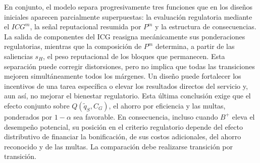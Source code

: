 En conjunto, el modelo separa progresivamente tres funciones que en los diseños iniciales aparecen parcialmente superpuestas: la evaluación regulatoria mediante el \(ICG^m\), la señal reputacional resumida por \(P^m\) y la estructura de consecuencias. La salida de componentes del ICG reasigna mecánicamente sus ponderaciones regulatorias, mientras que la composición de \(P^m\) determina, a partir de las saliencias \(s_H\), el peso reputacional de los bloques que permanecen. Esta separación puede corregir distorsiones, pero no implica que todas las transiciones mejoren simultáneamente todos los márgenes. Un diseño puede fortalecer los incentivos de una tarea específica o elevar los resultados directos del servicio y, aun así, no mejorar el bienestar regulatorio. Esta última conclusión exige que el efecto conjunto sobre \(Q(\widetilde q_S,C_G)\), el ahorro por eficiencia y las multas, ponderados por \(1-\alpha\) sea favorable. En consecuencia, incluso cuando \(B^{+}\) eleva el desempeño potencial, su posición en el criterio regulatorio depende del efecto distributivo de financiar la bonificación, de sus costos adicionales, del ahorro reconocido y de las multas. La comparación debe realizarse transición por transición.

